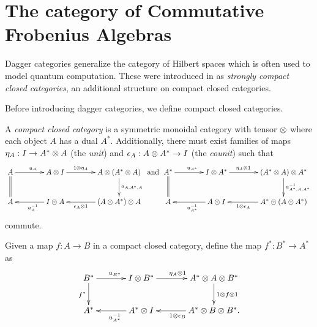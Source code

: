 \section{The category of Commutative Frobenius Algebras} %
\label{sec:the_category_of_commutative_frobenius_algebras}
Dagger categories generalize the category of Hilbert spaces which is often used to model quantum
computation. These were introduced in \cite{abramsky04:catsemquantprot} as \emph{strongly compact
closed categories}, an additional structure on compact closed categories.

Before introducing dagger categories, we define compact closed
categories.



\begin{definition}\label{def:compactclosedcat}
A \emph{compact closed category} \cD{} is a symmetric monoidal category with tensor $\otimes$ where each
object $A$ has a dual $A^{*}$. Additionally, there must exist families of maps $\eta_{A}: I \to
A^{*} \otimes A$ (the \emph{unit}) and $\epsilon_{A}: A\otimes A^{*}\to I$ (the \emph{counit}) such that
\[
  \xymatrix@C+15pt{
    A \ar[r]^{u_{A}} \ar@{=}[d]  & A\*I \ar[r]^(.4){1\*\eta_{A}}
        & A\* (A^{*}\*A) \ar[d]^{a_{A,A^{*},A}} \\
    A & I\* A \ar[l]^{u_{A}^{-1}} & (A\* A^{*})\*A \ar[l]^(.6){\epsilon_{A}\*1}
    }\text{ and }
  \xymatrix@C+15pt{
    A^{*} \ar[r]^{u_{A^*}} \ar@{=}[d]  & I\*A^* \ar[r]^(.4){\eta_{A}\*1}
        & (A^{*}\* A)\*A^{*} \ar[d]^{a_{A^{*},A,A^{*}}^{-1}} \\
    A & A\*I \ar[l]^{u_{A^*}^{-1}} & A^{*}\*(A\*A^{*}) \ar[l]^(.6){1\*\epsilon_{A}}
    }
  \]
commute.
\end{definition}

Given a map $f:A\to B$ in a compact closed category,  define the map $f^{*}:B^{*} \to A^{*}$ as
\[
  \xymatrix@C+10pt{
    B^{*}\ar[r]^{u_{B^{*}}} \ar[d]_{f^{*}}& I\*B^{*} \ar[r]^{\eta_{A}\*1}
      & A^{*}\*A\*B^{*}\ar[d]^{1\*f\*1}\\
    A^{*}&    A^{*}\*I\ar[l]^{u_{A^{*}}^{-1}}  &   A^{*}\*B\*B^{*}\ar[l]^{1\*\epsilon_{B}}.
  }
\]






